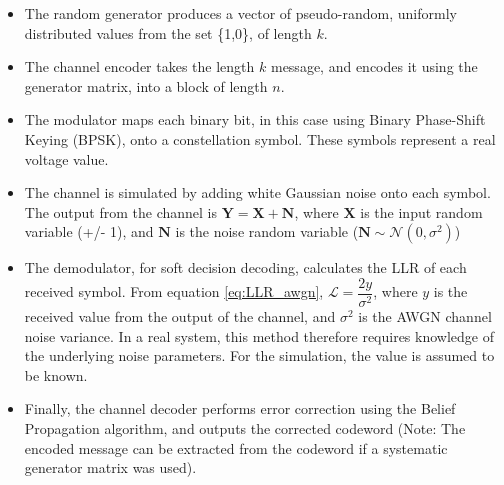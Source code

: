 \documentclass[11pt]{article}
\numberwithin{equation}{subsection}
\begin{document}
\begin{itemize}
\item The random generator produces a vector of pseudo-random, uniformly distributed values from the set \{1,0\}, of length $k$.
\item The channel encoder takes the length $k$ message, and encodes it using the generator matrix, into a block of length $n$.
\item The modulator maps each binary bit, in this case using Binary Phase-Shift Keying (BPSK), onto a constellation symbol. These symbols represent a real voltage value.
\item The channel is simulated by adding white Gaussian noise onto each symbol. The output from the channel is $\mathbf{Y = X + N}$, where $\mathbf{X}$ is the input random variable (+/- 1), and $\mathbf{N}$ is the noise random variable ($\mathbf{N} \sim \mathcal{N}(0,\sigma^2)$)
\item The demodulator, for soft decision decoding, calculates the LLR of each received symbol. From equation \ref{eq:LLR_awgn}, $\mathcal{L} = \dfrac{2y}{\sigma^2}$, where $y$ is the received value from the output of the channel, and $\sigma^2$ is the AWGN channel noise variance. In a real system, this method therefore requires knowledge of the underlying noise parameters. For the simulation, the value is assumed to be known.
\item Finally, the channel decoder performs error correction using the Belief Propagation algorithm, and outputs the corrected codeword (Note: The encoded message can be extracted from the codeword if a systematic generator matrix was used).
\end{itemize}
\end{document}
